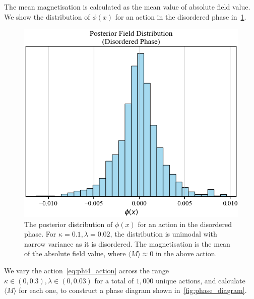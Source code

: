 \documentclass[11pt]{article}
\begin{document}
    The mean magnetisation is calculated as the mean value of absolute field value.
    We show the distribution of $\phi(x)$ for an action in the disordered phase in~\cref{fig:magnetisation}.
\begin{figure}[h!]
    \center
    \includegraphics[width=\linewidth]{../figures/Magnetisation}
    \caption{
        The posterior distribution of $\phi(x)$ for an action in the disordered phase.
        For $\kappa = 0.1, \lambda = 0.02$, the distribution is unimodal with narrow variance as it is disordered.
        The magnetisation is the mean of the absolute field value, where $\langle M \rangle \approx 0$ in the above
        action.
    }\label{fig:magnetisation}
    \end{figure}

    We vary the action~\eqref{eq:phi4_action} across the range $\kappa \in (0, 0.3), \lambda \in (0, 0.03)$ for
    a total of $1,000$ unique actions, and calculate $\langle M \rangle$ for each one, to construct a phase diagram
    shown in~\cref{fig:phase_diagram}.
\end{document}
